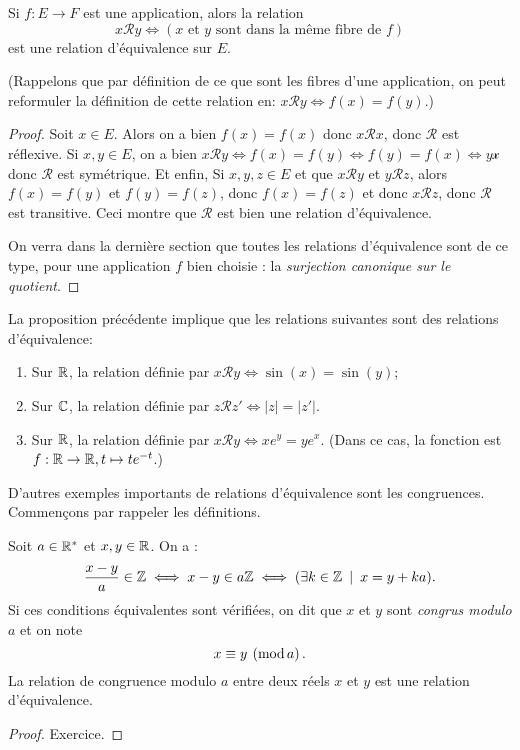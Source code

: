 \begin{proposition}
Si $f : E\to F$ est une application, alors la relation 
\[
x\mathcal R y \iff (x\text{ et }y \text{ sont dans la même fibre de }f)
\]
est une relation d'équivalence sur $E$.

(Rappelons que par définition de ce que sont les fibres d'une application, on peut reformuler la définition de cette relation en: $x\mathcal R y \iff f(x)=f(y)$.)
\end{proposition}
\begin{proof}
Soit $x \in E$. Alors on a bien $f(x)=f(x)$ donc $x\mathcal R x$, donc $\mathcal R$ est réflexive. Si $x, y\in E$, on a bien $x\mathcal R y \iff f(x)=f(y) \iff f(y)=f(x) \iff y\mathcal x$ donc $\mathcal R$ est symétrique. Et enfin, Si $x,y,z\in E$ et que $x\mathcal R y$ et $y\mathcal R z$, alors $f(x)=f(y)$ et $f(y)=f(z)$, donc $f(x)=f(z)$ et donc $x\mathcal R z$, donc $\mathcal R$ est transitive. Ceci montre que $\mathcal R$ est bien une relation d'équivalence.

On verra dans la dernière section que toutes les relations d'équivalence sont de ce type, pour une application $f$ bien choisie : la \emph{surjection canonique sur le quotient}.
\end{proof}

\begin{exemple} La proposition précédente implique que les relations suivantes sont des relations d'équivalence:
\begin{enumerate}
\item Sur $\mathbb{R}$, la relation définie par $x\mathcal R y \iff \sin(x)=\sin(y)$;
\item Sur $\mathbb{C}$, la relation définie par $z\mathcal R z' \iff |z|=|z'|$.
\item Sur $\mathbb{R}$, la relation définie par $x\mathcal R y \iff xe^y=ye^x$. (Dans ce cas, la fonction est $f :\mathbb{R}\to \mathbb{R}, t\mapsto te^{-t}$.)
\end{enumerate}
\end{exemple}

D'autres exemples importants de relations d'équivalence sont les congruences. Commençons par rappeler les définitions.

\begin{propdef}
Soit $a\in \mathbb{R}^*$ et $x,y\in\mathbb{R}$. On a :
\[
\frac{x-y}{a}\in \Z 
\iff
x-y \in a\Z
\iff 
(\exists k\in \Z\:\mid\: x=y+ka).
\]
Si ces conditions équivalentes sont vérifiées, on dit que $x$ et $y$ sont \emph{congrus modulo $a$} et on note 
\[ x\equiv y \:\left(\operatorname{mod}a\right).\]
La relation de congruence modulo $a$ entre deux réels $x$ et $y$ est une relation d'équivalence.
\end{propdef}
\begin{proof}
Exercice.
\end{proof}

